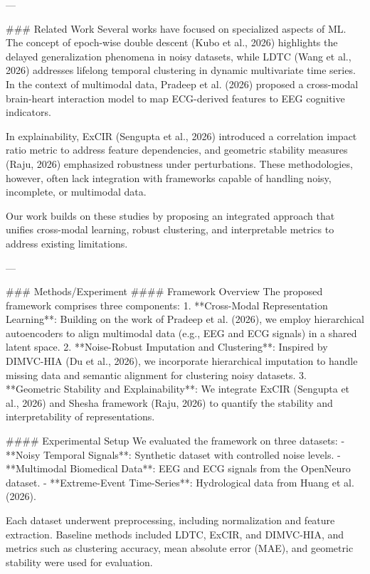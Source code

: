 ---

### Related Work
Several works have focused on specialized aspects of ML. The concept of epoch-wise double descent (Kubo et al., 2026) highlights the delayed generalization phenomena in noisy datasets, while LDTC (Wang et al., 2026) addresses lifelong temporal clustering in dynamic multivariate time series. In the context of multimodal data, Pradeep et al. (2026) proposed a cross-modal brain-heart interaction model to map ECG-derived features to EEG cognitive indicators.

In explainability, ExCIR (Sengupta et al., 2026) introduced a correlation impact ratio metric to address feature dependencies, and geometric stability measures (Raju, 2026) emphasized robustness under perturbations. These methodologies, however, often lack integration with frameworks capable of handling noisy, incomplete, or multimodal data.

Our work builds on these studies by proposing an integrated approach that unifies cross-modal learning, robust clustering, and interpretable metrics to address existing limitations.

---

### Methods/Experiment
#### Framework Overview
The proposed framework comprises three components:
1. **Cross-Modal Representation Learning**: Building on the work of Pradeep et al. (2026), we employ hierarchical autoencoders to align multimodal data (e.g., EEG and ECG signals) in a shared latent space.
2. **Noise-Robust Imputation and Clustering**: Inspired by DIMVC-HIA (Du et al., 2026), we incorporate hierarchical imputation to handle missing data and semantic alignment for clustering noisy datasets.
3. **Geometric Stability and Explainability**: We integrate ExCIR (Sengupta et al., 2026) and Shesha framework (Raju, 2026) to quantify the stability and interpretability of representations.

#### Experimental Setup
We evaluated the framework on three datasets:
- **Noisy Temporal Signals**: Synthetic dataset with controlled noise levels.
- **Multimodal Biomedical Data**: EEG and ECG signals from the OpenNeuro dataset.
- **Extreme-Event Time-Series**: Hydrological data from Huang et al. (2026).

Each dataset underwent preprocessing, including normalization and feature extraction. Baseline methods included LDTC, ExCIR, and DIMVC-HIA, and metrics such as clustering accuracy, mean absolute error (MAE), and geometric stability were used for evaluation.

